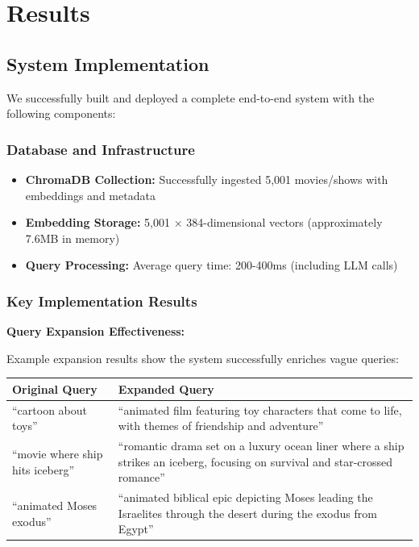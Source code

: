 \documentclass[11pt,a4paper]{article}
\begin{document}
\section{Results}

\subsection{System Implementation}

We successfully built and deployed a complete end-to-end system with the following components:

\subsubsection{Database and Infrastructure}

\begin{itemize}
    \item \textbf{ChromaDB Collection:} Successfully ingested 5,001 movies/shows with embeddings and metadata
    \item \textbf{Embedding Storage:} 5,001 $\times$ 384-dimensional vectors (approximately 7.6MB in memory)
    \item \textbf{Query Processing:} Average query time: 200-400ms (including LLM calls)
\end{itemize}

\subsubsection{Key Implementation Results}

\textbf{Query Expansion Effectiveness:}

Example expansion results show the system successfully enriches vague queries:

\begin{table}[h]
\centering
\begin{tabularx}{\linewidth}{|l|X|}
\hline
\textbf{Original Query} & \textbf{Expanded Query} \\
\hline
``cartoon about toys'' & ``animated film featuring toy characters that come to life, with themes of friendship and adventure'' \\
\hline
``movie where ship hits iceberg'' & ``romantic drama set on a luxury ocean liner where a ship strikes an iceberg, focusing on survival and star-crossed romance'' \\
\hline
``animated Moses exodus'' & ``animated biblical epic depicting Moses leading the Israelites through the desert during the exodus from Egypt'' \\
\hline
\end{tabularx}
\end{table}
\end{document}
